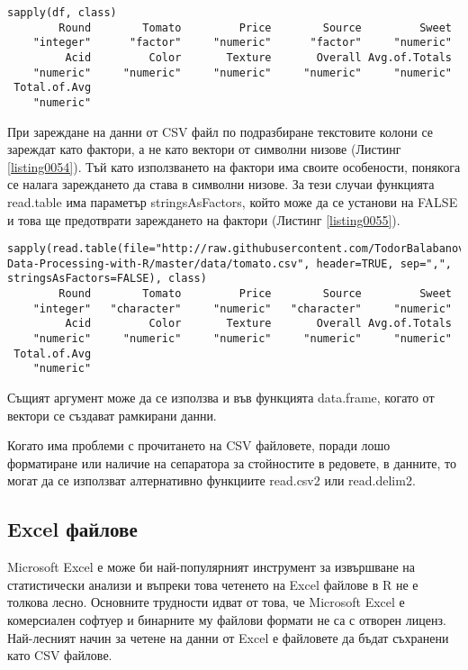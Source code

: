 \begin{lstlisting}[caption=Проверка на типовете\, които колоните имат, label=listing0054]
sapply(df, class)
        Round        Tomato         Price        Source         Sweet 
    "integer"      "factor"     "numeric"      "factor"     "numeric" 
         Acid         Color       Texture       Overall Avg.of.Totals 
    "numeric"     "numeric"     "numeric"     "numeric"     "numeric" 
 Total.of.Avg 
    "numeric" 
\end{lstlisting}

При зареждане на данни от CSV файл по подразбиране текстовите колони се зареждат като фактори, а не като вектори от символни низове (Листинг \ref{listing0054}). Тъй като използването на фактори има своите особености, понякога се налага зареждането да става в символни низове. За тези случаи функцията read.table има параметър stringsAsFactors, който може да се установи на FALSE и това ще предотврати зареждането на фактори (Листинг \ref{listing0055}).

\begin{lstlisting}[caption=Зареждане на символни низове, label=listing0055]
sapply(read.table(file="http://raw.githubusercontent.com/TodorBalabanov/Statistical-Data-Processing-with-R/master/data/tomato.csv", header=TRUE, sep=",", stringsAsFactors=FALSE), class)
        Round        Tomato         Price        Source         Sweet 
    "integer"   "character"     "numeric"   "character"     "numeric" 
         Acid         Color       Texture       Overall Avg.of.Totals 
    "numeric"     "numeric"     "numeric"     "numeric"     "numeric" 
 Total.of.Avg 
    "numeric"
\end{lstlisting}

Същият аргумент може да се използва и във функцията data.frame, когато от вектори се създават рамкирани данни. 

Когато има проблеми с прочитането на CSV файловете, поради лошо форматиране или наличие на сепаратора за стойностите в редовете, в данните, то могат да се използват алтернативно функциите read.csv2 или read.delim2.

\subsection{Excel файлове}

Microsoft Excel е може би най-популярният инструмент за извършване на статистически анализи и въпреки това четенето на Excel файлове в R не е толкова лесно. Основните трудности идват от това, че Microsoft Excel е комерсиален софтуер и бинарните му файлови формати не са с отворен лиценз. Най-лесният начин за четене на данни от Excel е файловете да бъдат съхранени като CSV файлове. 

